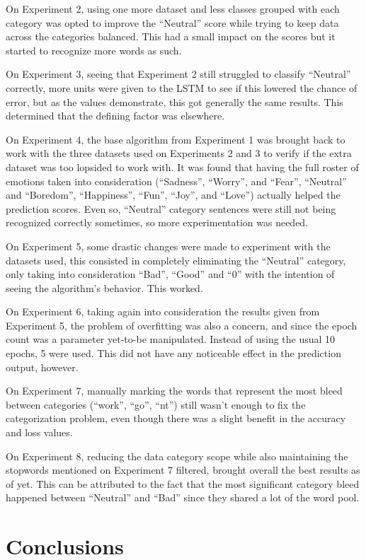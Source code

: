 \documentclass[review]{elsarticle} %
\begin{document}
On Experiment 2, using one more dataset and less classes grouped with each category was opted to improve the ``Neutral'' score while trying to keep data across the categories balanced. This had a small impact on the scores but it started to recognize more words as such.

On Experiment 3, seeing that Experiment 2 still struggled to classify ``Neutral'' correctly, more units were given to the LSTM to see if this lowered the chance of error, but as the values demonstrate, this got generally the same results. This determined that the defining factor was elsewhere.

On Experiment 4, the base algorithm from Experiment 1 was brought back to work with the three datasets used on Experiments 2 and 3 to verify if the extra dataset was too lopsided to work with. It was found that having the full roster of emotions taken into consideration (``Sadness'', ``Worry'', and ``Fear'', ``Neutral'' and ``Boredom'', ``Happiness'', ``Fun'', ``Joy'', and ``Love'') actually helped the prediction scores. Even so, ``Neutral'' category sentences were still not being recognized correctly sometimes, so more experimentation was needed.

On Experiment 5, some drastic changes were made to experiment with the datasets used, this consisted in completely eliminating the ``Neutral'' category, only taking into consideration ``Bad'', ``Good'' and ``0'' with the intention of seeing the algorithm's behavior. This worked. 

On Experiment 6, taking again into consideration the results given from Experiment 5, the problem of overfitting was also a concern, and since the epoch count was a parameter yet-to-be manipulated. Instead of using the usual 10 epochs, 5 were used. This did not have any noticeable effect in the prediction output, however.

On Experiment 7, manually marking the words that represent the most bleed between categories (``work'', ``go'', ``nt'') still wasn't enough to fix the categorization problem, even though there was a slight benefit in the accuracy and loss values.

On Experiment 8, reducing the data category scope while also maintaining the stopwords mentioned on Experiment 7 filtered, brought overall the best results as of yet. This can be attributed to the fact that the most significant category bleed happened between ``Neutral'' and ``Bad'' since they shared a lot of the word pool.

\section{Conclusions}
\end{document}
